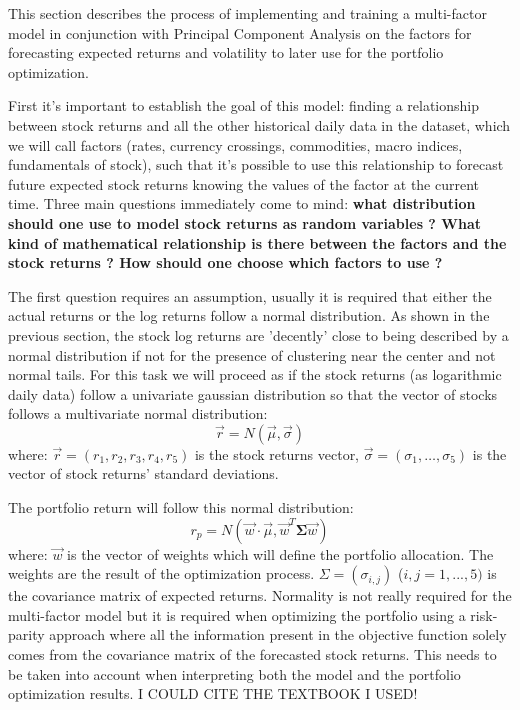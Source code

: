 This section describes the process of implementing and training a multi-factor model in conjunction with Principal Component Analysis on the factors for forecasting expected returns and volatility to later use for the portfolio optimization.

First it's important to establish the goal of this model: finding a relationship between stock returns and all the other historical daily data in the dataset, which we will call factors (rates, currency crossings, commodities, macro indices, fundamentals of stock), such that it's possible to use this relationship to forecast future expected stock returns knowing the values of the factor at the current time.
Three main questions immediately come to mind: \textbf{what distribution should one use to model stock returns as random variables ? What kind of mathematical relationship is there between the factors and the stock returns ? How should one choose which factors to use ?} 

The first question requires an assumption, usually it is required that either the actual returns or the log returns follow a normal distribution. As shown in the previous section, the stock log returns are 'decently' close to being described by a normal distribution if not for the presence of clustering near the center and not normal tails. For this task we will proceed as if the stock returns (as logarithmic daily data) follow a univariate gaussian distribution so that the vector of stocks follows a multivariate normal distribution:
\begin{equation}
    \Vec{r} = N(\Vec{\mu}, \Vec{\sigma})
\end{equation}
where: $\Vec{r} = (r_1, r_2, r_3, r_4, r_5)$ is the stock returns vector, $\Vec{\sigma} = (\sigma_1, \dots, \sigma_5)$ is the vector of stock returns' standard deviations.

The  portfolio return will follow this normal  distribution:
\begin{equation}
        r_p = N(\Vec{w}\cdot\Vec{\mu}, \Vec{w}^{T}\mathbf{\Sigma}\Vec{w})
\end{equation}
where: $\Vec{w}$ is the vector of weights which will define the portfolio allocation. The weights are the result of the optimization process. $\Sigma = (\sigma_{i,j})$ ($i,j = 1,...,5)$ is the covariance matrix of expected returns.
Normality is not really required for the multi-factor model but it is required when optimizing the portfolio using a risk-parity approach where all the information present in the objective function solely comes from the covariance matrix of the forecasted stock returns. This needs to be taken into account when interpreting both the model and the portfolio optimization results.
I COULD CITE THE TEXTBOOK I USED!


